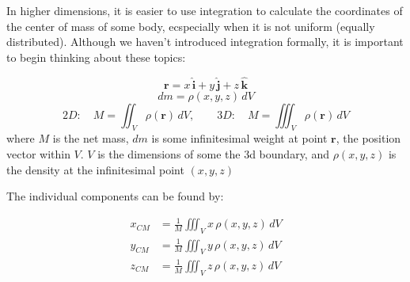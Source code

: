 In higher dimensions, it is easier to use integration to calculate the coordinates of the center of mass of some body, ecspecially when it is not uniform (equally distributed). Although we haven't introduced integration formally, it is important to begin thinking about these topics:
\begin{mdframed}[style=important, frametitle={2D and 3D Center of Mass}]
  $$\mathbf{r} = x\,\hat{\mathbf{i}} + y\,\hat{\mathbf{j}} + z\,\hat{\mathbf{k}}$$
  $$dm = \rho(x,y,z)\,dV$$
  $$2D: \quad M=\displaystyle\iint_{\;V} \rho(\mathbf r)\,dV, \qquad 3D: \quad M=\displaystyle\iiint_{\;V} \rho(\mathbf r)\,dV$$
  where $M$ is the net mass, $dm$ is some infinitesimal weight at point $\mathbf{r}$, the position vector within $V$. $V$ is the dimensions of some the 3d boundary, and $\rho(x,y,z)$ is the density at the infinitesimal point $(x,y,z)$

  The individual components can be found by:
\begin{center}
  \begin{align*}
      x_{CM}&=\frac{1}{M}\iiint_V x\,\rho(x,y,z)\,dV \\
        y_{CM}&=\frac{1}{M}\iiint_V y\,\rho(x,y,z)\,dV \\ 
        z_{CM}&=\frac{1}{M}\iiint_V z\,\rho(x,y,z)\,dV \\
  \end{align*}
\end{center}
\end{mdframed}